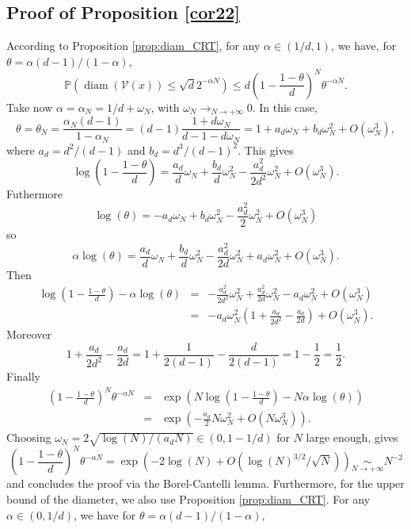 \documentclass[paper=a4, fontsize=11pt]{scrartcl}
\newcommand{\diam}{\operatorname{diam}}
\newcommand{\PP}{\mathbb{P}}
\begin{document}
\subsection*{Proof of Proposition \ref{cor22}}

According to Proposition \ref{prop:diam_CRT}, for any $\alpha \in (1/d,1)$, we have, for $\theta = \alpha (d-1)/(1-\alpha)$,
\begin{equation*}
    \PP(\diam(\mathcal{V}(x))\leq \sqrt{d}2^{-\alpha N}) \leq d\left(1-\frac{1-\theta}{d}\right)^N \theta^{-\alpha N}.
\end{equation*}
Take now $\alpha=\alpha_N=1/d+\omega_N$, with $\omega_N \rightarrow_{N\rightarrow +\infty} 0$. In this case,
\[
\theta=\theta_N=\frac{\alpha_N(d-1)}{1-\alpha_N}=(d-1)\frac{1+d\omega_N}{d-1-d\omega_N}=1+a_d \omega_N+ b_d \omega_N^2+O(\omega_N^3),
\]
where $a_d=d^2/(d-1)$ and $b_d=d^3/(d-1)^2$. This gives
\[
\log\left(1-\frac{1-\theta}{d}\right)= \frac{a_d}{d} \omega_N+ \frac{b_d}{d}\omega_N^2 - \frac{a^2_d}{2d^2}\omega_N^2 + O(\omega_N^3).
\]
Futhermore $$\log(\theta) = - a_d \omega_N + b_d \omega_N^2 -  \frac{a_d^2}{2} \omega_N^2 + O(\omega_N^3)$$
so $$\alpha \log(\theta) = \frac{a_d}{d} \omega_N + \frac{b_d}{d} \omega_N^2 -  \frac{a_d^2}{2d} \omega_N^2 + a_d \omega_N^2 + O(\omega_N^3).$$
Then 
\begin{eqnarray*}
    \log\left(1-\frac{1-\theta}{d}\right) - \alpha \log(\theta) &=& -\frac{a^2_d}{2d^2}\omega_N^2 + \frac{a_d^2}{2d} \omega_N^2 - a_d \omega_N^2 + O(\omega_N^3) \\ &=& - a_d \omega_N^2 \left( 1 + \frac{a_d}{2d^2} - \frac{a_d}{2d} \right) + O(\omega_N^3).
\end{eqnarray*}
Moreover 
$$1 + \frac{a_d}{2d^2} - \frac{a_d}{2d}  = 1 + \frac{1}{2(d-1)} - \frac{d}{2(d-1)} = 1 - \frac{1}{2} = \frac{1}{2}.$$
Finally
\begin{eqnarray*}
  \left(1-\frac{1-\theta}{d}\right)^N \theta^{-\alpha N} &=& \exp \left( N \log\left(1-\frac{1-\theta}{d}\right) - N \alpha \log(\theta)    \right) \\ &=& \exp \left( - \frac{a_d}{2} N \omega_N^2 + O(N \omega_N^3)  \right).  
\end{eqnarray*}
Choosing $\omega_N=2 \sqrt{\log(N)/(a_d N)} \in (0 , 1 - 1/d)$ for $N$ large enough, gives
$$\left(1-\frac{1-\theta}{d}\right)^N \theta^{-\alpha N} = \exp \left( - 2 \log(N) + O \left(\log(N)^{3/2} / \sqrt{N}   \right) \right) \underset{ {N \to + \infty}}\sim N^{-2}$$
and concludes the proof via the Borel-Cantelli lemma. Furthermore, for the upper bound of the diameter, we also use Proposition \ref{prop:diam_CRT}. For any $\alpha \in (0,1/d)$, we have for $\theta = \alpha (d-1)/(1-\alpha)$,
\end{document}
